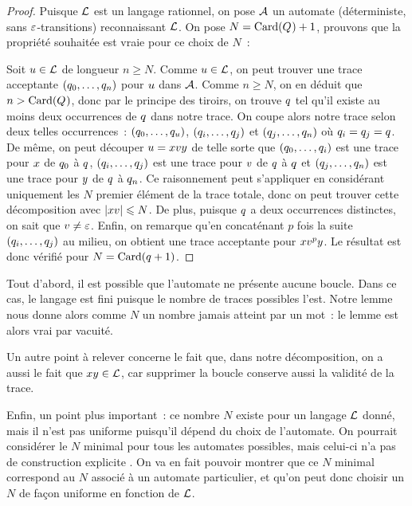 \begin{proof}
  Puisque $\mathcal L$ est un langage rationnel, on pose $\mathcal{A}$ un automate
  (déterministe, sans $\varepsilon$-transitions) reconnaissant $\mathcal L$. On pose
  $N = \operatorname{Card}(Q_{}) + 1$, prouvons que la propriété souhaitée est vraie pour ce
  choix de $N$~:

  Soit $u\in\mathcal L$ de longueur $n \geq N$. Comme $u \in \mathcal L$, on
  peut trouver une trace acceptante $(q_{0},\ldots,q_{n})$ pour $u$
  dans $\mathcal{A}$. Comme $n \geq N$, on en déduit que $n > \operatorname{Card}(Q_{})$, donc
  par le principe des tiroirs, on trouve $q_{}$ tel qu'il existe au moins deux
  occurrences de $q_{}$ dans notre trace. On coupe alors notre trace selon deux
  telles occurrences~: $(q_{0},\ldots,q_{u})$,
  $(q_{i},\ldots,q_{j})$ et $(q_{j},\ldots,q_{n})$ où
  $q_{i} = q_{j} = q_{}$. De même, on peut découper
  $u = xvy$ de telle sorte que
  $(q_{0},\ldots,q_{i})$ est une trace pour $x$ de $q_{0}$ à $q_{}$,
  $(q_{i},\ldots,q_{j})$ est une trace pour $v$ de $q_{}$ à
  $q_{}$ et
  $(q_{j},\ldots,q_{n})$ est une trace pour $y$ de $q_{}$ à
  $q_{n}$. Ce raisonnement peut s'appliquer en considérant uniquement les
  $N$ premier élément de la trace totale, donc on peut trouver cette
  décomposition avec $|xv| \leqslant N$. De plus, puisque $q_{}$ a deux
  occurrences distinctes, on sait que $v \neq \varepsilon$.
  Enfin, on remarque qu'en concaténant $p$ fois la suite
  $(q_{i},\ldots,q_{j})$ au milieu, on obtient une trace acceptante pour
  $xv^py$. Le résultat est donc vérifié pour
  $N = \operatorname{Card}(q_{}+1)$.
\end{proof}

\begin{remark}
  Tout d'abord, il est possible que l'automate ne présente aucune boucle. Dans
  ce cas, le langage est fini puisque le nombre de traces possibles l'est. Notre
  lemme nous donne alors comme $N$ un nombre jamais atteint par un mot~: le
  lemme est alors vrai par vacuité.

  Un autre point à relever concerne le fait que, dans notre décomposition, on a
  aussi le fait que $xy \in \mathcal L$, car supprimer la boucle conserve
  aussi la validité de la trace.

  Enfin, un point plus important~: ce nombre $N$ existe pour un langage $\mathcal L$
  donné, mais il n'est pas uniforme puisqu'il dépend du choix de l'automate. On
  pourrait considérer le $N$ minimal pour tous les automates possibles, mais
  celui-ci n'a pas de construction explicite . On va en fait
  pouvoir montrer que ce $N$ minimal correspond au $N$ associé à un automate
  particulier, et qu'on peut donc choisir un $N$ de façon uniforme en fonction
  de $\mathcal L$.
\end{remark}

